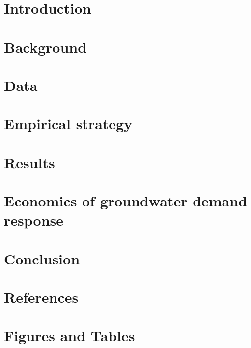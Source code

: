 \documentclass[hidelinks,12pt]{article}
\begin{document}
\newpage
\clearpage
\setcounter{page}{1}
\begin{refsection}
\begin{spacing}{1.5} {

\section{Introduction}
\label{sec:intro}


\section{Background}
\label{sec:background}



\section{Data}
\label{sec:data}



\section{Empirical strategy}
\label{sec:empirics}



\section{Results}
\label{sec:results}



\section{Economics of groundwater demand response}
\label{sec:mechanisms}


\section{Conclusion}
\label{sec:conclusion}

}
\end{spacing}

\pagebreak
\section*{References}
\printbibliography[heading=none]
\newpage
\end{refsection}
\FloatBarrier
\section*{Figures and Tables}
\end{document}
